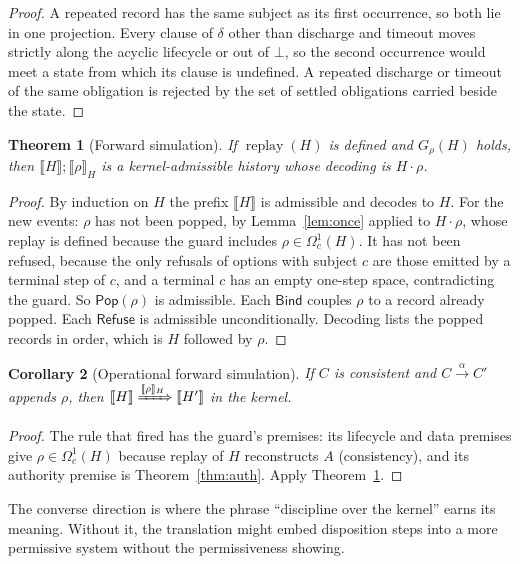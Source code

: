 \documentclass[11pt,openany]{book}
\newtheorem{theorem}{Theorem}[chapter]
\newtheorem{corollary}[theorem]{Corollary}
\theoremstyle{remark}
\newcommand{\Pop}{\mathsf{Pop}}
\newcommand{\Refuse}{\mathsf{Refuse}}
\newcommand{\Bind}{\mathsf{Bind}}
\newcommand{\replay}{\operatorname{replay}}
\begin{document}
\begin{proof}
A repeated record has the same subject as its first occurrence, so both
lie in one projection. Every clause of $\delta$ other than discharge and
timeout moves strictly along the acyclic lifecycle or out of $\bot$, so
the second occurrence would meet a state from which its clause is
undefined. A repeated discharge or timeout of the same obligation is
rejected by the set of settled obligations carried beside the state.
\end{proof}

\begin{theorem}[Forward simulation]\label{thm:fwd}
If $\replay(H)$ is defined and $G_\rho(H)$ holds, then
$\llbracket H\rrbracket;\llbracket\rho\rrbracket_H$ is a kernel-admissible
history whose decoding is $H\cdot\rho$.
\end{theorem}

\begin{proof}
By induction on $H$ the prefix $\llbracket H\rrbracket$ is admissible and
decodes to $H$. For the new events: $\rho$ has not been popped, by
Lemma~\ref{lem:once} applied to $H\cdot\rho$, whose replay is defined
because the guard includes $\rho\in\Omega^1_c(H)$. It has not been
refused, because the only refusals of options with subject $c$ are those
emitted by a terminal step of $c$, and a terminal $c$ has an empty
one-step space, contradicting the guard. So $\Pop(\rho)$ is admissible.
Each $\Bind$ couples $\rho$ to a record already popped. Each $\Refuse$ is
admissible unconditionally. Decoding lists the popped records in order,
which is $H$ followed by $\rho$.
\end{proof}

\begin{corollary}[Operational forward simulation]
If $C$ is consistent and $C\xrightarrow{\alpha}C'$ appends $\rho$, then
$\llbracket H\rrbracket\xRightarrow{\llbracket\rho\rrbracket_H}\llbracket H'\rrbracket$
in the kernel.
\end{corollary}

\begin{proof}
The rule that fired has the guard's premises: its lifecycle and data
premises give $\rho\in\Omega^1_c(H)$ because replay of $H$ reconstructs
$A$ (consistency), and its authority premise is Theorem~\ref{thm:auth}.
Apply Theorem~\ref{thm:fwd}.
\end{proof}

The converse direction is where the phrase ``discipline over the kernel''
earns its meaning. Without it, the translation might embed disposition
steps into a more permissive system without the permissiveness showing.
\end{document}
